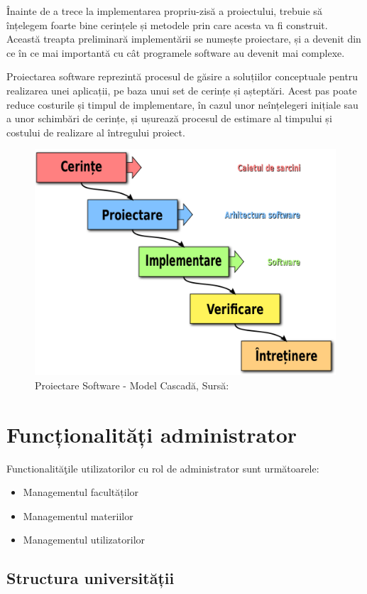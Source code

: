 \documentclass[12pt, a4paper, oneside, romanian]{teza-upb}
\begin{document}
Înainte de a trece la implementarea propriu-zisă a proiectului, trebuie să înțelegem foarte bine cerințele și metodele prin care acesta va fi construit. Această treapta preliminară implementării se numește proiectare, și a devenit din ce în ce mai importantă cu cât programele software au devenit mai complexe.

Proiectarea software reprezintă procesul de găsire a soluțiilor conceptuale pentru realizarea unei aplicații, pe baza unui set de cerințe și așteptări. Acest pas poate reduce costurile și timpul de implementare, în cazul unor neînțelegeri inițiale sau a unor schimbări de cerințe, și ușurează procesul de estimare al timpului și costului de realizare al întregului proiect.\cite{proiectaresoftware}

\begin{figure}[H]
\centering
\includegraphics*[width=0.55\columnwidth]{proiectare-software-model-cascada}
\caption{Proiectare Software - Model Cascadă, Sursă: \cite{proiectaresoftwaremodelcascada}}
\label{proiectare-software-model-cascada}
\end{figure}

\section{Funcționalități administrator}

Functionalităţile utilizatorilor cu rol de administrator sunt următoarele:
\begin{itemize}
	\item Managementul facultăților
	\item Managementul materiilor
	\item Managementul utilizatorilor
\end{itemize}

\subsection{Structura universității}
\end{document}
